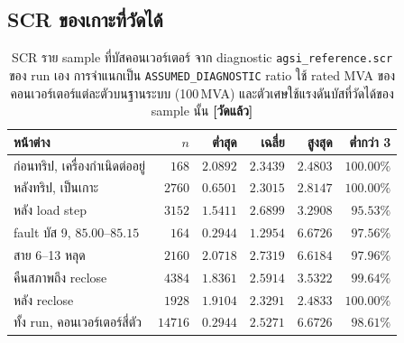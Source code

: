 \documentclass[12pt,a4paper]{article}
\theoremstyle{remark}
\newcommand{\code}[1]{\texttt{\small #1}}
\newcommand{\measured}{\textcolor{ok}{\textbf{[วัดแล้ว]}}}
\begin{document}
\subsection{SCR ของเกาะที่วัดได้}

\begin{table}[H]
\centering
\small
\begin{tabular}{@{}lrrrrr@{}}
\toprule
\textbf{หน้าต่าง} & $n$ & \textbf{ต่ำสุด} & \textbf{เฉลี่ย} & \textbf{สูงสุด} & \textbf{ต่ำกว่า 3}\\
\midrule
ก่อนทริป, เครื่องกำเนิดต่ออยู่ & $168$ & $2.0892$ & $2.3439$ & $2.4803$ & $100.00\%$\\
หลังทริป, เป็นเกาะ      & $2760$ & $0.6501$ & $2.3015$ & $2.8147$ & $100.00\%$\\
หลัง load step          & $3152$ & $1.5411$ & $2.6899$ & $3.2908$ & $95.53\%$\\
fault บัส 9, $85.00$--$85.15$ & $164$ & $0.2944$ & $1.2954$ & $6.6726$ & $97.56\%$\\
สาย 6--13 หลุด          & $2160$ & $2.0718$ & $2.7319$ & $6.6184$ & $97.96\%$\\
คืนสภาพถึง reclose      & $4384$ & $1.8361$ & $2.5914$ & $3.5322$ & $99.64\%$\\
หลัง reclose            & $1928$ & $1.9104$ & $2.3291$ & $2.4833$ & $100.00\%$\\
\midrule
ทั้ง run, คอนเวอร์เตอร์สี่ตัว & $14716$ & $0.2944$ & $2.5271$ & $6.6726$ & $\mathbf{98.61\%}$\\
\bottomrule
\end{tabular}
\caption{SCR ราย sample ที่บัสคอนเวอร์เตอร์ จาก diagnostic
\code{agsi\_reference.scr} ของ run เอง การจำแนกเป็น \code{ASSUMED\_DIAGNOSTIC}
ratio ใช้ rated MVA ของคอนเวอร์เตอร์แต่ละตัวบนฐานระบบ (100\,MVA)
และตัวเศษใช้แรงดันบัสที่วัดได้ของ sample นั้น \measured}
\label{tab:scr}
\end{table}
\end{document}
